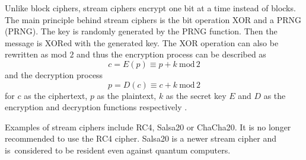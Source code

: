 Unlike block ciphers, stream ciphers encrypt one bit at a time instead of blocks. The main principle behind stream ciphers is the bit operation XOR and a PRNG (\acl{PRNG}). The key is randomly generated by the PRNG function. Then the message is XORed with the generated key. The XOR operation can also be rewritten as mod $2$ and thus the encryption process can be described as
\begin{equation}
  c = E(p)\equiv p + k\ \mathrm{mod}\,2
\end{equation}
\noindent and the decryption process
\begin{equation}
  p = D(c)\equiv c + k\ \mathrm{mod}\,2
\end{equation}
\noindent for $c$ as the ciphertext, $p$ as the plaintext, $k$ as the secret key $E$ and $D$ as the encryption and decryption functions respectively \cite{Paar2010}.

Examples of stream ciphers include RC4, Salsa20 or ChaCha20. It is no longer recommended to use the RC4 cipher. Salsa20 is a newer stream cipher and is~considered to be resident even against quantum computers. \cite{Bernstein149}\cite{Ristic2014}
